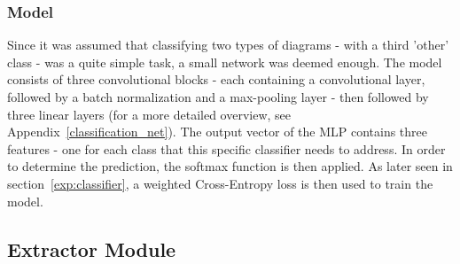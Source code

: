 \documentclass[conference]{IEEEtran}
\begin{document}
\subsubsection{Model}
Since it was assumed that classifying two types of diagrams - with a third 'other' class - was a quite simple task, a small network was deemed enough. The model consists of three convolutional blocks - each containing a convolutional layer, followed by a batch normalization and a max-pooling layer - then followed by three linear layers (for a more detailed overview, see Appendix~\ref{classification_net}). The output vector of the MLP contains three features - one for each class that this specific classifier needs to address. In order to determine the prediction, the softmax function is then applied. As later seen in section~\ref{exp:classifier}, a weighted Cross-Entropy loss is then used to train the model.  \\

\subsection{Extractor Module}
\end{document}

